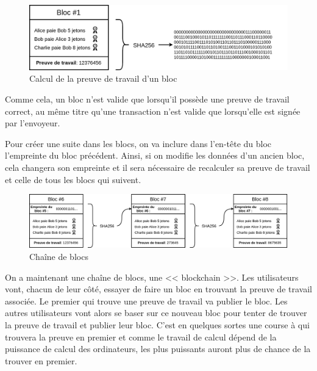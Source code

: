 \begin{figure}[H]
  \centering
  \includegraphics[width=\textwidth]{images/crypto_8}
  \caption{Calcul de la preuve de travail d'un bloc}
\end{figure}

Comme cela, un bloc n'est valide que lorsqu'il possède une preuve de travail correct, au même titre qu'une transaction n'est valide que lorsqu'elle est signée par l'envoyeur.

Pour créer une suite dans les blocs, on va inclure dans l'en-tête du bloc l'empreinte du bloc précédent. Ainsi, si on modifie les données d'un ancien bloc, cela changera son empreinte et il sera nécessaire de recalculer sa preuve de travail et celle de tous les blocs qui suivent.

\begin{figure}[H]
  \centering
  \includegraphics[width=\textwidth]{images/crypto_9}
  \caption{Chaîne de blocs}
\end{figure}

On a maintenant une chaîne de blocs, une << blockchain >>. Les utilisateurs vont, chacun de leur côté, essayer de faire un bloc en trouvant la preuve de travail associée. Le premier qui trouve une preuve de travail va publier le bloc. Les autres utilisateurs vont alors se baser sur ce nouveau bloc pour tenter de trouver la preuve de travail et publier leur bloc. C'est en quelques sortes une course à qui trouvera la preuve en premier et comme le travail de calcul dépend de la puissance de calcul des ordinateurs, les plus puissants auront plus de chance de la trouver en premier. 

